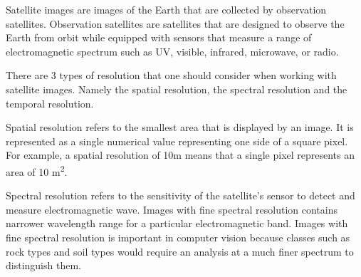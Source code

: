 Satellite images are images of the Earth that are collected by observation satellites. Observation satellites are satellites that are designed to observe the Earth from orbit while equipped with sensors that measure a range of  electromagnetic spectrum such as UV, visible, infrared, microwave, or radio. 

There are 3 types of resolution that one should consider when working with satellite images. Namely the spatial resolution, the spectral resolution and the temporal resolution.

Spatial resolution refers to the smallest area that is displayed by an image. It is represented as a single numerical value representing one side of a square pixel. For example, a spatial resolution of 10m means that a single pixel represents an area of 10 m\textsuperscript{2}.

Spectral resolution refers to the sensitivity of the satellite's sensor to detect and measure electromagnetic wave. Images with fine spectral resolution contains narrower wavelength range for a particular electromagnetic band. Images with fine spectral resolution is important in computer vision because  classes such as rock types and soil types would require an analysis at a much finer spectrum to distinguish them.


